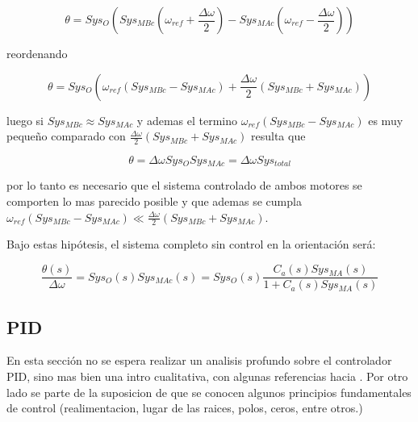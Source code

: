 \documentclass[10pt,conference,a4paper,onecolumn]{article}%
\begin{document}
\begin{equation}
\theta=Sys_O\left(Sys_{MBc}(\omega_{ref}+\frac{\Delta \omega}{2}) - Sys_{MAc} (\omega_{ref}-\frac{\Delta \omega}{2}) \right)
\end{equation}

reordenando

\begin{equation}
\theta=Sys_O\left(\omega_{ref} (Sys_{MBc}-Sys_{MAc})+  \frac{\Delta \omega}{2}( Sys_{MBc}+Sys_{MAc})  \right)
\end{equation}

luego si $Sys_{MBc} \approx Sys_{MAc}$ y ademas el termino $\omega_{ref} (Sys_{MBc}-Sys_{MAc})$ es muy pequeño comparado con $ \frac{\Delta \omega}{2}( Sys_{MBc}+Sys_{MAc}) $ resulta que

\begin{equation}
\theta=\Delta \omega Sys_OSys_{MAc}= \Delta \omega Sys_{total}
\end{equation}

por lo tanto es necesario que el sistema controlado de ambos motores se comporten lo mas parecido posible y que ademas se cumpla $\omega_{ref} (Sys_{MBc}-Sys_{MAc}) \ll  \frac{\Delta \omega}{2}( Sys_{MBc}+Sys_{MAc}) $.

Bajo estas hipótesis, el sistema completo sin control en la orientación será:

\begin{equation}
\frac{\theta(s)}{\Delta \omega}=Sys_O(s)Sys_{MAc}(s)=Sys_O(s)\frac{C_a(s)Sys_{MA}(s)}{1+C_a(s)Sys_{MA}(s)}
\label{eq:sys_tot_LA}
\end{equation}

%


\subsection{PID}

En esta sección no se espera realizar un analisis profundo sobre el controlador PID, sino mas bien una intro cualitativa, con algunas referencias hacia \cite{biblia_PID}. Por otro lado se parte de la suposicion de que se conocen algunos principios fundamentales de control (realimentacion, lugar de las raices, polos, ceros, entre otros.)
\end{document}
